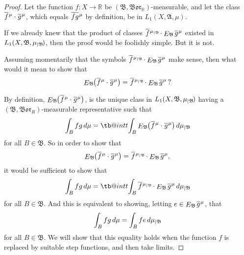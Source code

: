 \documentclass[
twoside=true,
paper=letter,
fontsize=9pt,
pagesize=auto,
leqno,
openany,
headsepline,
overfullrule,
]{scrbook}
\makeatletter
\theoremstyle{plain}
\theoremstyle{plain}
\theoremstyle{definition}
\theoremstyle{bfnoteitalic}
\theoremstyle{bfnoteroman}
\newcommand{\sigalg}[1]{\mathfrak{#1}}
\newcommand{\kondexpsub}[2]
{\mathop{E}\nolimits_{#2}\hspace{-1pt}#1}
\newcommand{\borel}{\mathfrak{Bor}}
\newcommand{\restrictedto}[1]{_{\lvert#1}\kern-1.5pt}
\newcommand{\R}{\mathbb{R}}
\newcommand{\sigmaalgebra}{\sigalg{A}}
\newcommand{\sigmaalgebraii}{\sigalg{B}}
\newcommand{\funcf}{f}
\newcommand{\funcg}{g}
\newcommand{\function}{f}
\newcommand{\functionii}{g}
\newcommand{\measurespace}{X}
\newcommand{\measure}{\mu}
\newcommand{\measmu}{\mu}
\newcommand{\setii}{B}
\newcommand*\xbar[1]{%
   \hbox{%
     \vbox{%
       \hrule height 0.4pt %
       \kern0.4ex%
       \hbox{%
         \ensuremath{#1}%
       }%
     }%
   }%
}
\newcommand\tint{\mathop{\mathpalette\tb@int{t}}\!\int}
\newcommand\tb@int[2]{%
  \sbox\z@{$\m@th#1\int$}%
  \if#2t%
    \rlap{\hbox to\wd\z@{%
      \hfil
      \vrule width .35em height \dimexpr\ht\z@+1.4pt\relax depth -\dimexpr\ht\z@+1pt\relax
      \kern.05em %
    }}
  \else
    \rlap{\hbox to\wd\z@{%
      \vrule width .35em height -\dimexpr\dp\z@+1pt\relax depth \dimexpr\dp\z@+1.4pt\relax
      \hfil
    }}
  \fi
}
\newcommand{\lebclass}[1]{\hspace{.5pt}\xbar{#1}\hspace{0.5pt}}
\newcommand{\ellclass}[2]{\lebclass{#1}^{#2}}
\newcommand{\inducedint}{\tint}
\makeatother
\begin{document}
\begin{proof}
Let the function $\function:\measurespace\to\R$ be
$(\sigmaalgebraii, \borel_\R)$\hyp{}measurable,  and let the class
$\ellclass{\funcf}{\measmu} \cdot \ellclass{\funcg}{\measmu}$,
which equals
$\ellclass{\funcf\funcg}{\measmu}$ by definition,
be in
$L_1(\measurespace, \sigmaalgebra,\measmu)$.

If we already knew that the product of classes
$\ellclass{\function}{\measure\restrictedto{\sigmaalgebraii}}
\cdot
\kondexpsub{\ellclass{\functionii}{\measure}}{\sigmaalgebraii}$
existed in
$L_1(\measurespace, \sigmaalgebraii, \measmu\restrictedto{\sigmaalgebraii})$,
then the proof would be foolishly simple.  But it is not.

Assuming momentarily that the symbols
$\ellclass{\function}{\measure\restrictedto{\sigmaalgebraii}}
\cdot
\kondexpsub{\ellclass{\functionii}{\measure}}{\sigmaalgebraii}$
make sense, then what would it mean to show that
\[
\kondexpsub{\bigl(\ellclass{\function}{\measure}
\cdot
\ellclass{\functionii}{\measure}\bigr)}{\sigmaalgebraii}
=
\ellclass{\function}{\measure\restrictedto{\sigmaalgebraii}}
\cdot
\kondexpsub{\ellclass{\functionii}{\measure}}{\sigmaalgebraii}
\,?\]

By definition,
$\kondexpsub{\bigl(\ellclass{\function}{\measure}
\cdot
\ellclass{\functionii}{\measure}\bigr)}{\sigmaalgebraii}$,
is the unique class in
$L_1(\measurespace, \sigmaalgebraii, \measmu\restrictedto{\sigmaalgebraii})$
having a $( \sigmaalgebraii, \borel_R )$\hyp{}measurable representative such that
\[
\int_\setii \funcf\funcg \,d\measmu
=
\inducedint_\setii
\kondexpsub{\bigl(\ellclass{\function}{\measure}
\cdot
\ellclass{\functionii}{\measure}\bigr)}{\sigmaalgebraii}
\, d \measmu\restrictedto{\sigmaalgebraii}
\]
for all $\setii\in\sigmaalgebraii$.
So in order to show that
\[
\kondexpsub{\bigl(\ellclass{\function}{\measure}
\cdot
\ellclass{\functionii}{\measure}\bigr)}{\sigmaalgebraii}
=
\ellclass{\function}{\measure\restrictedto{\sigmaalgebraii}}
\cdot
\kondexpsub{\ellclass{\functionii}{\measure}}{\sigmaalgebraii},
\]
it would be sufficient to show that
\[
\int_\setii \funcf\funcg \,d\measmu
=
\inducedint_\setii
\ellclass{\function}{\measure\restrictedto{\sigmaalgebraii}}
\cdot
\kondexpsub{\ellclass{\functionii}{\measure}}{\sigmaalgebraii}
\, d \measmu\restrictedto{\sigmaalgebraii}
\]
for all $\setii\in\sigmaalgebraii$.
And this is equivalent to showing, letting
$e \in
\kondexpsub{\ellclass{\funcg}{\measmu}}{\sigalg{B}}$,
that
\[
\int_\setii \funcf\funcg \,d\measmu
=
\int_\setii
\funcf
e
\, d \measmu\restrictedto{\sigmaalgebraii}
\]
for all $\setii\in\sigmaalgebraii$.
We will show that this equality holds when the function $\funcf$ is replaced by suitable step functions, and then take limits.


\end{proof}
\end{document}
